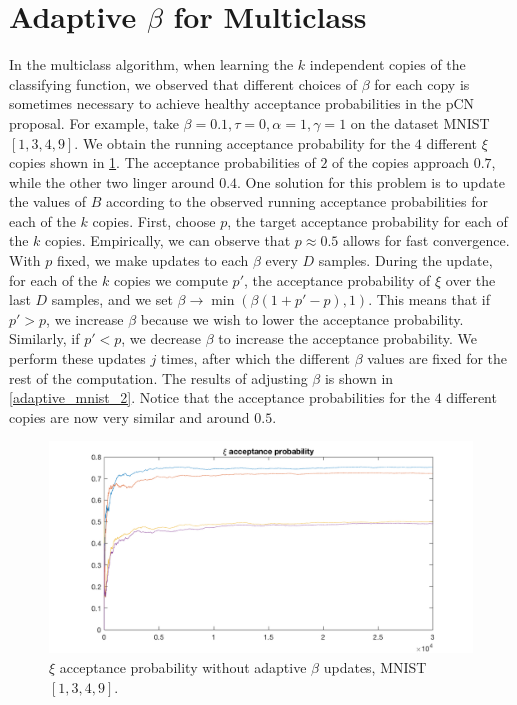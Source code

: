\documentclass{siamart1116}
\begin{document}
\section{Adaptive $\beta$ for Multiclass}
    In the multiclass algorithm, when learning the $k$ independent copies of the classifying function, we observed that different choices of $\beta$ for each copy is sometimes necessary to achieve healthy acceptance probabilities in the pCN proposal. For example, take $\beta=0.1,\tau=0,\alpha=1,\gamma=1$ on the dataset MNIST $[1,3,4,9]$. We obtain the running acceptance probability for the $4$ different $\xi$ copies shown in \cref{adaptive_mnist_1}. The acceptance probabilities of $2$ of the copies approach $0.7$, while the other two linger around $0.4$. One solution for this problem is to update the values of $B$ according to the observed running acceptance probabilities for each of the $k$ copies. First, choose $p$, the target acceptance probability for each of the $k$ copies. Empirically, we can observe that $p\approx0.5$ allows for fast convergence. With $p$ fixed, we make updates to each $\beta$ every $D$ samples. During the update, for each of the $k$ copies we compute $p'$, the acceptance probability of $\xi$ over the last $D$ samples, and we set $\beta \to \min(\beta(1+p'-p),1)$. This means that if $p'>p$, we increase $\beta$ because we wish to lower the acceptance probability. Similarly, if $p'<p$, we decrease $\beta$ to increase the acceptance probability. We perform these updates $j$ times, after which the different $\beta$ values are fixed for the rest of the computation. The results of adjusting $\beta$ is shown in \cref{adaptive_mnist_2}. Notice that the acceptance probabilities for the $4$ different copies are now very similar and around $0.5$.

    \begin{figure}[!htb]
        \centering
        \caption{\label{adaptive_mnist_1}$\xi$ acceptance probability without adaptive $\beta$ updates, MNIST $[1,3, 4, 9]$.}
        \includegraphics[width=0.8\linewidth]{adaptive_B/without/xi_accept.png}
    \end{figure}
\end{document}
